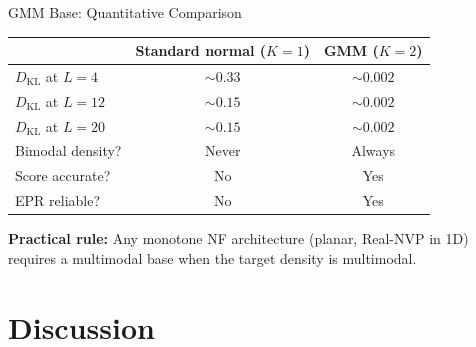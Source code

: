 \documentclass[aspectratio=169,11pt]{beamer}
\newcommand{\emphbox}[1]{\colorbox{blue!8}{\parbox{0.92\textwidth}{#1}}}
\begin{document}

\begin{frame}{GMM Base: Quantitative Comparison}

\centering
\begin{tabular}{lcc}
\toprule
& \textbf{Standard normal ($K\!=\!1$)} & \textbf{GMM ($K\!=\!2$)} \\
\midrule
$D_{\mathrm{KL}}$ at $L=4$ & $\sim 0.33$ & $\sim 0.002$ \\
$D_{\mathrm{KL}}$ at $L=12$ & $\sim 0.15$ & $\sim 0.002$ \\
$D_{\mathrm{KL}}$ at $L=20$ & $\sim 0.15$ & $\sim 0.002$ \\
\midrule
Bimodal density? & \textcolor{alertred}{Never} & \textcolor{successgreen}{Always} \\
Score accurate? & \textcolor{alertred}{No} & \textcolor{successgreen}{Yes} \\
EPR reliable? & \textcolor{alertred}{No} & \textcolor{successgreen}{Yes} \\
\bottomrule
\end{tabular}

\vspace{0.8em}
\emphbox{
\centering
\textbf{Practical rule:} Any monotone NF architecture (planar, Real-NVP in 1D)\\
requires a multimodal base when the target density is multimodal.
}

\end{frame}

\section{Discussion}
\end{document}
